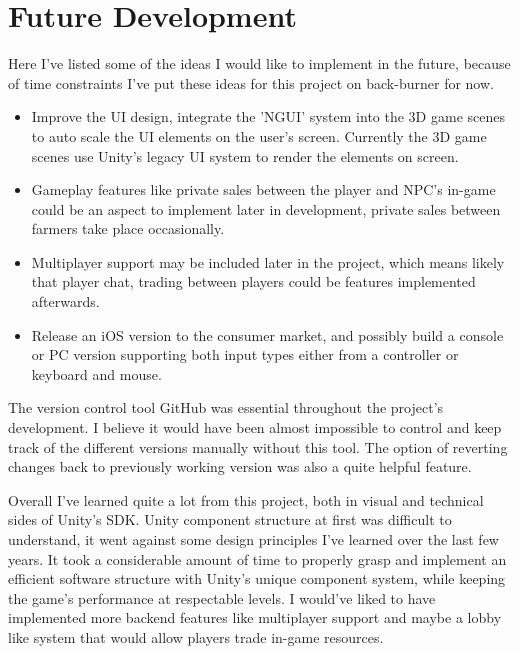 \section{Future Development}
Here I've listed some of the ideas I would like to implement in the future, because of time constraints I've put these ideas for this project on back-burner for now.
\begin{itemize}
\item Improve the UI design, integrate the 'NGUI' system into the 3D game scenes to auto scale the UI elements on the user's screen. Currently the 3D game scenes use Unity's legacy UI system to render the elements on screen.
\item Gameplay features like private sales between the player and NPC's in-game could be an aspect to implement later in development, private sales between farmers take place occasionally. 
\item Multiplayer support may be included later in the project, which means likely that player chat, trading between players could be features implemented afterwards.
\item Release an iOS version to the consumer market, and possibly build a console or PC version supporting both input types either from a controller or keyboard and mouse.
\end{itemize}
The version control tool GitHub was essential throughout the project's development. I believe it would have been almost impossible to control and keep track of the different versions manually without this tool. The option of reverting changes back to previously working version was also a quite helpful feature.

Overall I've learned quite a lot from this project, both in visual and technical sides of Unity's SDK. Unity component structure at first was difficult to understand, it went against some design principles I've learned over the last few years. It took a considerable amount of time to properly grasp and implement an efficient software structure with Unity's unique component system, while keeping the game's performance at respectable levels. I would've liked to have implemented more backend features like multiplayer support and maybe a lobby like system that would allow players trade in-game resources.
